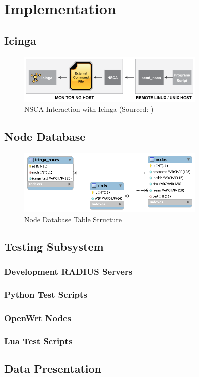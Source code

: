\section{Implementation}

\subsection{Icinga}


\begin{figure}[htb]
\centering
\includegraphics[width=0.8\textwidth]{img/nsca.png}
\caption{NSCA Interaction with Icinga (Sourced: \cite{icinga-nsca})}
\label{fig:nsca}
\end{figure}

\subsection{Node Database}


\begin{figure}[htb]
\centering
\includegraphics[width=0.8\textwidth]{img/nodedb.png}
\caption{Node Database Table Structure}
\label{fig:nodedb}
\end{figure}

\subsection{Testing Subsystem}

\subsubsection{Development RADIUS Servers}

\subsubsection{Python Test Scripts}

\subsubsection{OpenWrt Nodes}

\subsubsection{Lua Test Scripts}

\subsection{Data Presentation}

